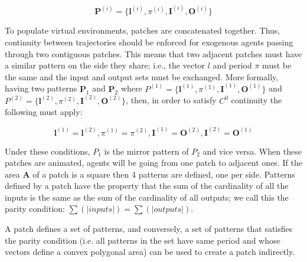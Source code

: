 \begin{equation}
	\mathbf{P}^{(i)} = \{\mathbf{l}^{(i)}, \pi^{(i)}, \mathbf{I}^{(i)}, \mathbf{O}^{(i)}\}
\end{equation}

To populate virtual environments, patches are concatenated together.
Thus, continuity between trajectories should be enforced for exogenous agents passing through two contiguous patches.
This means that two adjacent patches must have a similar pattern on the side they share; i.e., the vector $l$ and period $\pi$ must be the same and the input and output sets must be exchanged.
More formally, having two patterns $\mathbf{P}_1$ and $\mathbf{P}_2$ where
$P^{(1)}=\{\mathbf{l}^{(1)}, \pi^{(1)}, \mathbf{I}^{(1)}, \mathbf{O}^{(1)}\}$ and~
$P^{(2)}=\{\mathbf{l}^{(2)}, \pi^{(2)}, \mathbf{I}^{(2)}, \mathbf{O}^{(2)}\}$, then, in order to satisfy $C^0$ continuity the following must apply:

\begin{equation}
	\mathbf{l}^{(1)}=\mathbf{l}^{(2)}, \pi^{(1)}=\pi^{(2)}, \mathbf{I}^{(1)} = \mathbf{O}^{(2)}, \mathbf{I}^{(2)} = \mathbf{O}^{(1)}
\end{equation}

Under these conditions, $P_1$ is the mirror pattern of $P_2$ and vice versa.
When these patches are animated, agents will be going from one patch to adjacent ones. 
If the area $\mathbf{A}$ of a patch is a square then 4 patterns are defined, one per side.
Patterns defined by a patch have the property that the sum of the cardinality of all the inputs is the same as the sum of the cardinality of all outputs; we call this the parity condition: $\sum(|inputs|)= \sum(|outputs|)$.

A patch defines a set of patterns, and conversely, a set of patterns that satisfies the parity condition (i.e. all patterns in the set have same period and whose vectors define a convex polygonal area) can be used to create a patch indirectly.

% 



